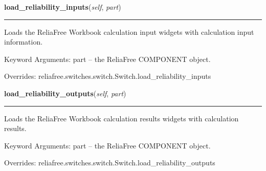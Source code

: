     \vspace{0.5ex}

\hspace{.8\funcindent}\begin{boxedminipage}{\funcwidth}

    \raggedright \textbf{load\_reliability\_inputs}(\textit{self}, \textit{part})

    \vspace{-1.5ex}

    \rule{\textwidth}{0.5\fboxrule}
\setlength{\parskip}{2ex}
    Loads the ReliaFree Workbook calculation input widgets with calculation
    input information.

    Keyword Arguments: part -- the ReliaFree COMPONENT object.

\setlength{\parskip}{1ex}
      Overrides: reliafree.switches.switch.Switch.load\_reliability\_inputs

    \end{boxedminipage}

    \vspace{0.5ex}

\hspace{.8\funcindent}\begin{boxedminipage}{\funcwidth}

    \raggedright \textbf{load\_reliability\_outputs}(\textit{self}, \textit{part})

    \vspace{-1.5ex}

    \rule{\textwidth}{0.5\fboxrule}
\setlength{\parskip}{2ex}
    Loads the ReliaFree Workbook calculation results widgets with 
    calculation results.

    Keyword Arguments: part -- the ReliaFree COMPONENT object.

\setlength{\parskip}{1ex}
      Overrides: reliafree.switches.switch.Switch.load\_reliability\_outputs

    \end{boxedminipage}

    \label{reliafree:switches:thumbwheel:Thumbwheel:calculate_mil_217_count}

    \vspace{0.5ex}

